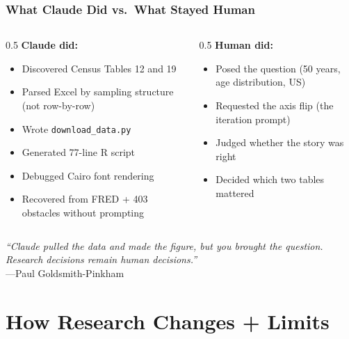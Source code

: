 \documentclass[10pt,english,aspectratio=169]{beamer}
\begin{document}
\begin{frame}
\frametitle{What Claude Did vs.\ What Stayed Human}

\begin{columns}[T]
\begin{column}{0.5\textwidth}
\textbf{Claude did:}
\begin{itemize}
    \item Discovered Census Tables 12 and 19
    \item Parsed Excel by sampling structure (not row-by-row)
    \item Wrote \texttt{download\_data.py}
    \item Generated 77-line R script
    \item Debugged Cairo font rendering
    \item Recovered from FRED + 403 obstacles without prompting
\end{itemize}
\end{column}
\begin{column}{0.5\textwidth}
\textbf{Human did:}
\begin{itemize}
    \item Posed the question (50 years, age distribution, US)
    \item Requested the axis flip (the iteration prompt)
    \item Judged whether the story was right
    \item Decided which two tables mattered
\end{itemize}
\end{column}
\end{columns}

\vspace{0.5cm}

\begin{center}
\textit{``Claude pulled the data and made the figure, but you brought the question. Research decisions remain human decisions.''}\\
{\small ---Paul Goldsmith-Pinkham}
\end{center}
\end{frame}

\section{How Research Changes + Limits}
\end{document}
